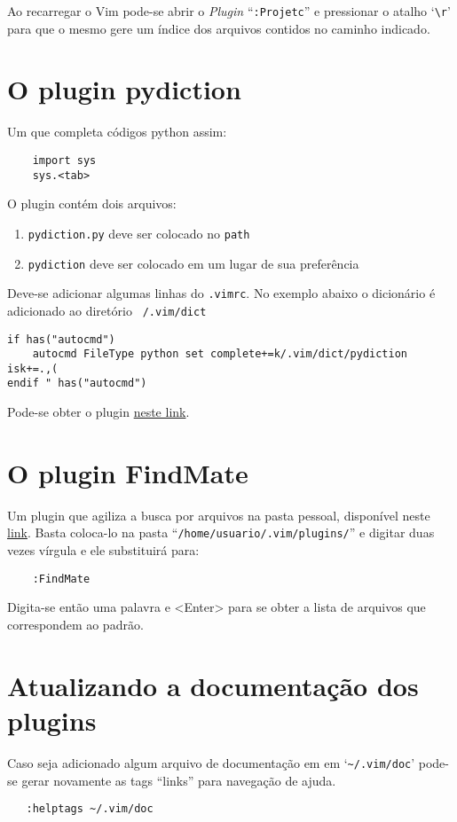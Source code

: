 Ao recarregar o Vim pode-se abrir o {\em Plugin} ``{\tt :Projetc}'' e 
pressionar o atalho `\verb+\r+' para que o mesmo gere um índice dos arquivos
contidos no caminho indicado.
   

\section{O plugin pydiction}
\label{sec:O plugin pydiction}

Um que completa códigos python assim:

\begin{verbatim}
    import sys
    sys.<tab>
\end{verbatim}

O plugin contém dois arquivos:

\begin{enumerate}
    \item {\tt pydiction.py} deve ser colocado no {\tt path}
    \item {\tt pydiction} deve ser colocado em um lugar de sua preferência
\end{enumerate}

Deve-se adicionar algumas linhas do {\tt .vimrc}.
No exemplo abaixo o dicionário é adicionado ao diretório {\tt ~/.vim/dict}
\begin{verbatim}
if has("autocmd")
    autocmd FileType python set complete+=k/.vim/dict/pydiction isk+=.,(
endif " has("autocmd") 
\end{verbatim}

Pode-se obter o plugin  \href{http://www.vim.org/scripts/script.php?script\_id=850}{neste link}.

\section{O plugin FindMate}
\label{sec:O plugin FindMate}

Um plugin que agiliza a busca por arquivos na pasta pessoal, disponível neste
 \href{http://snipt.net/voyeg3r/findmate-plugin-for-vim/}{link}. Basta
coloca-lo na pasta ``{\tt /home/usuario/.vim/plugins/}'' e digitar duas vezes
vírgula e ele substituirá para:

\begin{verbatim}
    :FindMate 
\end{verbatim}

Digita-se então uma palavra e <Enter> para se obter a lista de arquivos que
correspondem ao padrão.

\section{Atualizando a documentação dos plugins}
\label{sec:Atualizando a documentação dos plugins}

Caso seja adicionado algum arquivo de documentação em em `\verb+~/.vim/doc+' pode-se
gerar novamente as tags ``links'' para navegação de ajuda.

\begin{verbatim}
   :helptags ~/.vim/doc
\end{verbatim}
